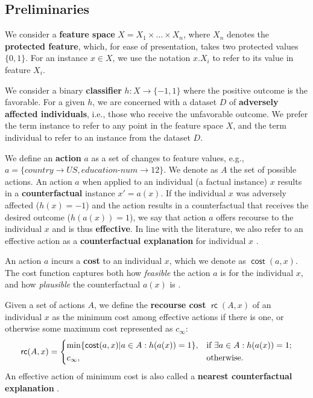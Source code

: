 \documentclass{article}
\DeclareMathOperator{\cost}{\mathsf{cost}}
\DeclareMathOperator{\rc}{\mathsf{rc}}
\begin{document}
\subsection{Preliminaries}
\label{sec:def:prelim}

We consider a \textbf{feature space} $X = X_1 \times \dots \times X_n$, where $X_n$ denotes the \textbf{protected feature}, which, for ease of presentation, takes two protected values $\{0, 1\}$. For an instance $x \in X$, we use the notation $x.X_i$ to refer to its value in feature $X_i$.

We consider a binary \textbf{classifier} $h: X \to \{-1, 1\}$ where the positive outcome is the favorable. For a given $h$, we are concerned with a dataset $D$ of \textbf{adversely affected individuals}, i.e., those who receive the unfavorable outcome. We prefer the term instance to refer to any point in the feature space $X$, and the term individual to refer to an instance from the dataset $D$.

 

We define an \textbf{action} $a$ as a set of changes to feature values, e.g., $a = \{\textit{country} \to \textit{US}, \textit{education-num} \to 12\}$. We denote as $A$ the set of possible actions.
An action $a$ when applied to an individual (a factual instance) $x$ results in a \textbf{counterfactual} instance $x' = a(x)$. If the individual $x$ was adversely affected ($h(x) =-1$) and the action results in a counterfactual that receives the desired outcome ($h(a(x)) = 1$), we say that action $a$ offers recourse to the individual $x$ and is thus \textbf{effective}.
In line with the literature, we also refer to an effective action as a \textbf{counterfactual explanation} for individual $x$ \cite{wachter2017counterfactual}.

An action $a$ incurs a \textbf{cost} to an individual $x$, which we denote as $\cost(a, x)$. The cost function captures both how \emph{feasible} the action $a$ is for the individual $x$, and how \emph{plausible} the counterfactual $a(x)$ is \cite{karimi2022survey}.


Given a set of actions $A$, we define the \textbf{recourse cost} $\rc(A,x)$ of an individual $x$ as the minimum cost among effective actions if there is one, or otherwise some maximum cost represented as $c_\infty$:
%
\[
\rc(A,x) = %
\begin{dcases}
\min \{ \cost(a,x) | a \in A : h(a(x)) = 1 \}, & \text{if\ } \exists a \in A : h(a(x)) = 1; \\
c_\infty, & \text{otherwise}.\\
\end{dcases}
\]
%
An effective action of minimum cost is also called a \textbf{nearest counterfactual explanation} \cite{karimi2022survey}.
\end{document}
